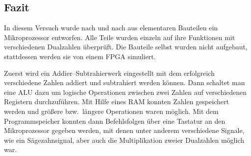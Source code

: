 \documentclass[10pt]{article}
\begin{document}
\begin{multicols}{2}
	\section{Fazit}
	In diesem Versuch wurde nach und nach aus elementaren Bauteilen ein Mikroprozessor entworfen.
	Alle Teile wurden einzeln auf ihre Funktionen mit verschiedenen Dualzahlen überprüft.
	Die Bauteile selbst wurden nicht aufgebaut, stattdessen werden sie von einem FPGA simuliert.
	\par Zuerst wird ein Addier--Subtrahierwerk eingestellt mit dem erfolgreich verschiedene Zahlen addiert und subtrahiert werden können.
	Dann schaltet man eine ALU dazu um logische Operationen zwischen zwei Zahlen auf verschiedenen Registern durchzuführen.
	Mit Hilfe eines RAM konnten Zahlen gespeichert werden und größere bzw.\ längere Operationen waren möglich.
	Mit dem Programmspeicher konnten dann Befehlsfolgen über eine Tastatur an den Mikroprozessor gegeben werden, mit denen unter anderem verschiedene Signale, wie ein Sägezahnsignal, aber auch die Multiplikation zweier Dualzahlen möglich war.
\end{multicols}
\end{document}
